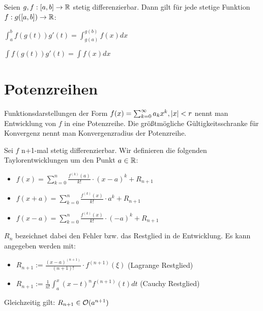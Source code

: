 \begin{satz}
	Seien $g,f : [a,b] \rightarrow \mathbb{R}$ stetig differenzierbar. Dann gilt für jede stetige Funktion $f : g([a,b]) \rightarrow \mathbb{R}$:
	\begin{description}[noitemsep]
		\item $\int_{a}^{b} f(g(t))g'(t) = \int_{g(a)}^{g(b)}f(x)dx$
		\item $\int f(g(t))g'(t) = \int f(x)dx$
	\end{description}
\end{satz}


\section{Potenzreihen}

\begin{definition}
	Funktionsdarstellungen der Form $f(x) = \sum_{k = 0}^{\infty} a_{k}x^k, |x| < r$ nennt man Entwicklung von $f$ in eine Potenzreihe. Die größtmögliche Gültigkeitsschranke für Konvergenz nennt man Konvergenzradius der Potenzreihe.
\end{definition}

\begin{satz}	
	Sei $f $ n+1-mal stetig differenzierbar. Wir definieren die folgenden Taylorentwicklungen um den Punkt $a \in \mathbb{R}$:
	
	\begin{itemize}[noitemsep]
		\item $f(x) =  \sum_{k = 0}^n \frac{f^{(k)}(a)}{k!} \cdot (x - a)^k + R_{n+1}$
		\item $f(x + a) = \sum_{k = 0}^n \frac{f^{(k)}(x)}{k!} \cdot a^k + R_{n+1}$
		\item $f(x - a) = \sum_{k = 0}^n \frac{f^{(k)}(x)}{k!} \cdot (-a)^k + R_{n+1}$
	\end{itemize}

	$R_n$ bezeichnet dabei den Fehler bzw. das Restglied in de Entwicklung. Es kann angegeben werden mit:
	
	\begin{itemize}[noitemsep]
		\item $R_{n+1} := \frac{(x - a)^{(n + 1)}}{(n + 1)!} \cdot f^{(n + 1)}(\xi)$ (Lagrange Restglied)
		\item $R_{n+1} := \frac{1}{n!} \int_{a}^{x} (x - t)^nf^{(n+1)}(t)dt$ (Cauchy Restglied)
	\end{itemize}

	Gleichzeitig gilt: $R_{n+1} \in \mathcal{O}(a^{n+1})$

\end{satz}


